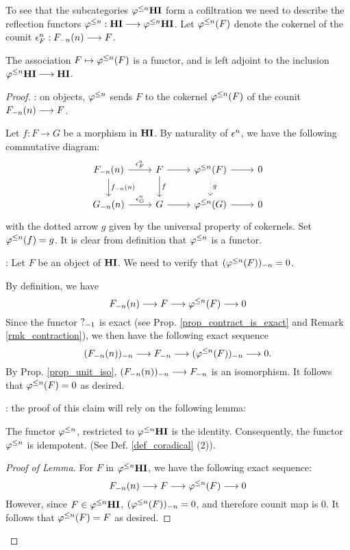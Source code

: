 To see that the subcategories $\tlHI{n} \HI$ form a cofiltration
we need to describe the reflection functors $\tlHI{n} : \HI \to 
\tlHI{n}\HI$. Let $\tlHI{n}(F)$ denote the cokernel of the counit 
$\cuHI^n_F: \LHI[n]{\RHI[n]{F}} \to F$.

\begin{prop}\label{prop_HI_lower_slice}
The association $F \mapsto \tlHI{n}(F)$ is a functor, and is left 
adjoint to the inclusion $\tlHI{n}\HI \to \HI$.
\end{prop}
\begin{proof}
 : on objects, $\tlHI{n}$ sends $F$ to the 
cokernel $\tlHI{n}(F)$ of the counit $\LHI[n]{\RHI[n]{F}} \to F$.

Let $f: F \to G$ be a morphism in $\HI$.
By naturality of $\cuHI^n$, we have the following commutative
diagram:
\[
\begin{tikzcd}
\LHI[n]{\RHI[n]{F}} \arrow{r}{\cuHI_F^n} \arrow{d}{\LHI[n]{\RHI[n]{f}}}
& F \arrow{r} \arrow{d}{f}
& \tlHI{n}(F) \arrow[dotted]{d}{g} \arrow{r}
& 0 \\
\LHI[n]{\RHI[n]{G}} \arrow{r}{\cuHI_G^n}
& G \arrow{r}
& \tlHI{n}(G) \arrow{r}
& 0
\end{tikzcd}
\]
with the dotted arrow $g$ given by the universal property of 
cokernels. Set $\tlHI{n}(f) = g$. It is clear from definition that
$\tlHI{n}$ is a functor.

 : Let $F$ be an object 
of $\HI$. We need to verify that $\RHI[n]{(\tlHI{n}(F))} = 0$.

By definition, we have
\[
\LHI[n]{\RHI[n]{F}} \to F \to \tlHI{n}(F) \to 0
\]
Since the functor $\RHI{?}$ is exact (see Prop.
\ref{prop_contract_is_exact} and Remark \ref{rmk_contraction}), we 
then have the following exact sequence
\[
\RHI[n]{(\LHI[n]{\RHI[n]{F}})} \to \RHI[n]{F} \to
\RHI[n]{(\tlHI{n}(F))} \to 0.
\]
By Prop. \ref{prop_unit_iso}, $\RHI[n]{(\LHI[n]{\RHI[n]{F}})}
\to \RHI[n]{F}$ is an isomorphism. It follows that $\tlHI{n}(F) = 
0$ as desired.

 : the proof
of this claim will rely on the following lemma:

\begin{lem}\label{lem_tlHI_id}
The functor $\tlHI{n}$, restricted to $\tlHI{n}\HI$ is the 
identity. Consequently, the functor $\tlHI{n}$ is idempotent.
(See Def. \ref{def_coradical} (2)).
\end{lem}
\begin{proof}[Proof of Lemma]
For $F$ in $\tlHI{n}\HI$, we have the following exact sequence:
\[
\LHI[n]{\RHI[n]{F}} \to F \to \tlHI{n}(F) \to 0
\]
However, since $F \in \tlHI{n}\HI$, $\RHI[n]{(\tlHI{n}(F))} = 0$, 
and therefore counit map is $0$. It follows that $\tlHI{n}(F) = F$ 
as desired.


\end{proof}
\end{proof}
